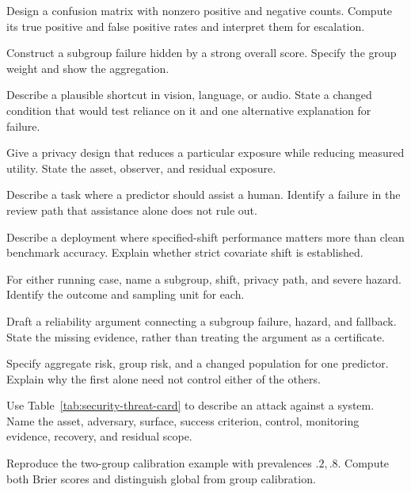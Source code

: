 \begin{exercises}
\item {}Design a confusion matrix with nonzero positive and negative counts. Compute its true positive and false positive rates and interpret them for escalation.
\item {}Construct a subgroup failure hidden by a strong overall score. Specify the group weight and show the aggregation.
\item {}Describe a plausible shortcut in vision, language, or audio. State a changed condition that would test reliance on it and one alternative explanation for failure.
\item {}Give a privacy design that reduces a particular exposure while reducing measured utility. State the asset, observer, and residual exposure.
\item {}Describe a task where a predictor should assist a human. Identify a failure in the review path that assistance alone does not rule out.
\item {}Describe a deployment where specified-shift performance matters more than clean benchmark accuracy. Explain whether strict covariate shift is established.
\item {}For either running case, name a subgroup, shift, privacy path, and severe hazard. Identify the outcome and sampling unit for each.
\item {}Draft a reliability argument connecting a subgroup failure, hazard, and fallback. State the missing evidence, rather than treating the argument as a certificate.
\item {}Specify aggregate risk, group risk, and a changed population for one predictor. Explain why the first alone need not control either of the others.
\item {}Use Table~\ref{tab:security-threat-card} to describe an attack against a system. Name the asset, adversary, surface, success criterion, control, monitoring evidence, recovery, and residual scope.
\item {}Reproduce the two-group calibration example with prevalences $.2,.8$. Compute both Brier scores and distinguish global from group calibration.

\end{exercises}

